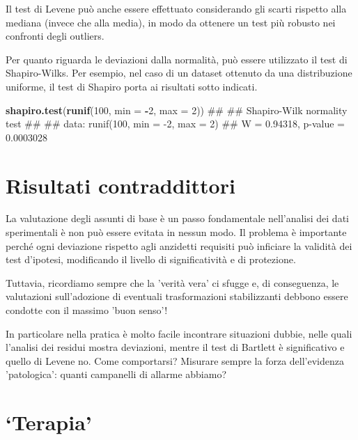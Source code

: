 \documentclass[a4paper,12pt,oneside]{book}
\newenvironment{Shaded}{\begin{snugshade}}{\end{snugshade}}
\newcommand{\KeywordTok}[1]{\textcolor[rgb]{0.13,0.29,0.53}{\textbf{#1}}}
\newcommand{\DataTypeTok}[1]{\textcolor[rgb]{0.13,0.29,0.53}{#1}}
\newcommand{\DecValTok}[1]{\textcolor[rgb]{0.00,0.00,0.81}{#1}}
\newcommand{\OperatorTok}[1]{\textcolor[rgb]{0.81,0.36,0.00}{\textbf{#1}}}
\newcommand{\NormalTok}[1]{#1}
\theoremstyle{definition}
\theoremstyle{definition}
\theoremstyle{definition}
\theoremstyle{remark}
\begin{document}
Il test di Levene può anche essere effettuato considerando gli scarti
rispetto alla mediana (invece che alla media), in modo da ottenere un
test più robusto nei confronti degli outliers.

Per quanto riguarda le deviazioni dalla normalità, può essere utilizzato
il test di Shapiro-Wilks. Per esempio, nel caso di un dataset ottenuto
da una distribuzione uniforme, il test di Shapiro porta ai risultati
sotto indicati.

\begin{Shaded}
\begin{Highlighting}[]
\KeywordTok{shapiro.test}\NormalTok{(}\KeywordTok{runif}\NormalTok{(}\DecValTok{100}\NormalTok{, }\DataTypeTok{min =} \OperatorTok{-}\DecValTok{2}\NormalTok{, }\DataTypeTok{max =} \DecValTok{2}\NormalTok{))}
\NormalTok{## }
\NormalTok{##  Shapiro-Wilk normality test}
\NormalTok{## }
\NormalTok{## data:  runif(100, min = -2, max = 2)}
\NormalTok{## W = 0.94318, p-value = 0.0003028}
\end{Highlighting}
\end{Shaded}

\section{Risultati contraddittori}\label{risultati-contraddittori}

La valutazione degli assunti di base è un passo fondamentale
nell'analisi dei dati sperimentali è non può essere evitata in nessun
modo. Il problema è importante perché ogni deviazione rispetto agli
anzidetti requisiti può inficiare la validità dei test d'ipotesi,
modificando il livello di significatività e di protezione.

Tuttavia, ricordiamo sempre che la 'verità vera' ci sfugge e, di
conseguenza, le valutazioni sull'adozione di eventuali trasformazioni
stabilizzanti debbono essere condotte con il massimo 'buon senso'!

In particolare nella pratica è molto facile incontrare situazioni
dubbie, nelle quali l'analisi dei residui mostra deviazioni, mentre il
test di Bartlett è significativo e quello di Levene no. Come
comportarsi? Misurare sempre la forza dell'evidenza 'patologica': quanti
campanelli di allarme abbiamo?

\section{\texorpdfstring{`Terapia'}{Terapia}}\label{terapia}
\end{document}
